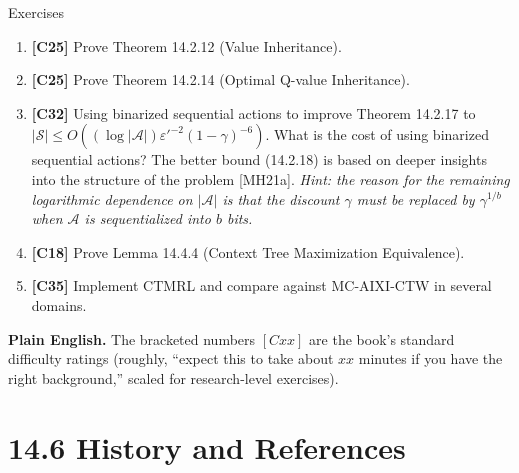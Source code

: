 \documentclass[aspectratio=169,10pt]{beamer}
\newcommand{\Sc}{\mathcal{S}}
\newcommand{\Ac}{\mathcal{A}}
\begin{document}
\begin{frame}[allowframebreaks]{Exercises}
  \begin{enumerate}
    \item \textbf{[C25]} Prove Theorem 14.2.12 (Value Inheritance).
    \item \textbf{[C25]} Prove Theorem 14.2.14 (Optimal Q-value Inheritance).
    \item \textbf{[C32]} Using binarized sequential actions to improve
      Theorem 14.2.17 to
      $|\Sc|\le O((\log|\Ac|)\varepsilon'^{-2}(1-\gamma)^{-6})$. What is the
      cost of using binarized sequential actions? The better bound
      (14.2.18) is based on deeper insights into the structure of the
      problem [MH21a]. \emph{Hint: the reason for the remaining
      logarithmic dependence on $|\Ac|$ is that the discount $\gamma$ must
      be replaced by $\gamma^{1/b}$ when $\Ac$ is sequentialized into $b$
      bits.}
    \item \textbf{[C18]} Prove Lemma 14.4.4 (Context Tree Maximization
      Equivalence).
    \item \textbf{[C35]} Implement CTMRL and compare against MC-AIXI-CTW
      in several domains.
  \end{enumerate}
  \vspace{0.5em}
  \textbf{Plain English.} The bracketed numbers $[Cxx]$ are the book's
  standard difficulty ratings (roughly, ``expect this to take about
  $xx$ minutes if you have the right background,'' scaled for
  research-level exercises).
\end{frame}

\section{14.6 History and References}
\end{document}
